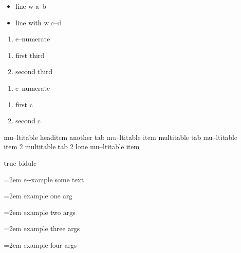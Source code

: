 \documentclass{book}
\begin{document}
\begin{itemize}[label=\hbox{} on a line]
\item line w a--b
\item line with w c--d
\end{itemize}

\begin{enumerate}[start=1]
\item e--numerate
\end{enumerate}

\begin{enumerate}[start=3]
\item first third
\item second third
\end{enumerate}

\begin{enumerate}[label=\alph*.]
\item e--numerate
\end{enumerate}

\begin{enumerate}[label=\alph*.,start=3]
\item first c
\item second c
\end{enumerate}

mu--ltitable headitem another tab
mu--ltitable item multitable tab
mu--ltitable item 2 multitable tab 2
%
lone mu--ltitable item

truc bidule

\par\begingroup\obeylines\obeyspaces\frenchspacing\leftskip=2em\relax\parskip=0pt\relax\ttfamily{}%
e{-}{-}xample  some
   text
\endgroup{}%

\par\begingroup\obeylines\obeyspaces\frenchspacing\leftskip=2em\relax\parskip=0pt\relax\ttfamily{}%
example one arg
\endgroup{}%

\par\begingroup\obeylines\obeyspaces\frenchspacing\leftskip=2em\relax\parskip=0pt\relax\ttfamily{}%
example two args
\endgroup{}%

\par\begingroup\obeylines\obeyspaces\frenchspacing\leftskip=2em\relax\parskip=0pt\relax\ttfamily{}%
example three args
\endgroup{}%

\par\begingroup\obeylines\obeyspaces\frenchspacing\leftskip=2em\relax\parskip=0pt\relax\ttfamily{}%
example four args
\endgroup{}%
\end{document}
